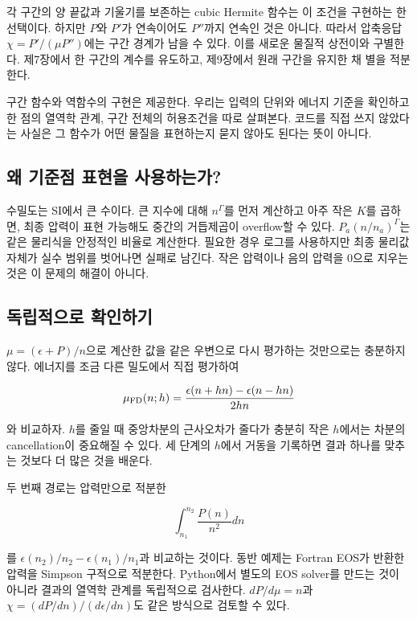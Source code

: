 \documentclass[
  10pt,
  a4paper,
]{article}
\begin{document}
각 구간의 양 끝값과 기울기를 보존하는 cubic Hermite 함수는 이 조건을
구현하는 한 선택이다. 하지만 \(P\)와 \(P'\)가 연속이어도 \(P''\)까지
연속인 것은 아니다. 따라서 압축응답 \(\chi=P'/(\mu P'')\)에는 구간
경계가 남을 수 있다. 이를 새로운 물질적 상전이와 구별한다. 제7장에서 한
구간의 계수를 유도하고, 제9장에서 원래 구간을 유지한 채 별을 적분한다.

구간 함수와 역함수의 구현은 제공한다. 우리는 입력의 단위와 에너지 기준을
확인하고 한 점의 열역학 관계, 구간 전체의 허용조건을 따로 살펴본다.
코드를 직접 쓰지 않았다는 사실은 그 함수가 어떤 물질을 표현하는지 묻지
않아도 된다는 뜻이 아니다.

\subsection{왜 기준점 표현을
사용하는가?}\label{uxc65c-uxae30uxc900uxc810-uxd45cuxd604uxc744-uxc0acuxc6a9uxd558uxb294uxac00}

수밀도는 SI에서 큰 수이다. 큰 지수에 대해 \(n^\Gamma\)를 먼저 계산하고
아주 작은 \(K\)를 곱하면, 최종 압력이 표현 가능해도 중간의 거듭제곱이
overflow할 수 있다. \(P_a(n/n_a)^\Gamma\)는 같은 물리식을 안정적인
비율로 계산한다. 필요한 경우 로그를 사용하지만 최종 물리값 자체가 실수
범위를 벗어나면 실패로 남긴다. 작은 압력이나 음의 압력을 0으로 지우는
것은 이 문제의 해결이 아니다.

\subsection{독립적으로
확인하기}\label{uxb3c5uxb9bduxc801uxc73cuxb85c-uxd655uxc778uxd558uxae30}

\(\mu=(\epsilon+P)/n\)으로 계산한 값을 같은 우변으로 다시 평가하는
것만으로는 충분하지 않다. 에너지를 조금 다른 밀도에서 직접 평가하여

\[
\mu_{\rm FD}(n;h)=\frac{\epsilon(n+hn)-\epsilon(n-hn)}{2hn}
\]

와 비교하자. \(h\)를 줄일 때 중앙차분의 근사오차가 줄다가 충분히 작은
\(h\)에서는 차분의 cancellation이 중요해질 수 있다. 세 단계의 \(h\)에서
거동을 기록하면 결과 하나를 맞추는 것보다 더 많은 것을 배운다.

두 번째 경로는 압력만으로 적분한

\[
\int_{n_1}^{n_2}\frac{P(n)}{n^2}dn
\]

를 \(\epsilon(n_2)/n_2-\epsilon(n_1)/n_1\)과 비교하는 것이다. 동반
예제는 Fortran EOS가 반환한 압력을 Simpson 구적으로 적분한다. Python에서
별도의 EOS solver를 만드는 것이 아니라 결과의 열역학 관계를 독립적으로
검사한다. \(dP/d\mu=n\)과 \(\chi=(dP/dn)/(d\epsilon/dn)\)도 같은
방식으로 검토할 수 있다.
\end{document}
